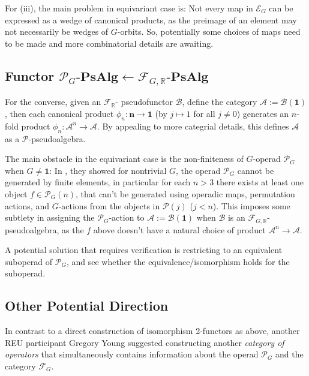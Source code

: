 \documentclass[openany, amssymb, psamsfonts]{amsart}
\theoremstyle{definition}
\numberwithin{equation}{section}
\newcommand{\PsAlg}{\mathbf{PsAlg}} %
\newcommand{\F}{\mathscr{F}} %
\newcommand{\cP}{\mathscr{P}} %
\newcommand{\A}{\mathscr{A}}
\newcommand{\B}{\mathscr{B}}
\newcommand{\RR}{\mathbb{R}} %
\begin{document}
For (iii), the main problem in equivariant case is: Not every map in $\mathscr{E}_G$ can be expressed as a wedge of canonical products, as the preimage of an element may not necessarily be wedges of $G$-orbits. So, potentially some choices of maps need to be made and more combinatorial details are awaiting.

\vspace{1pt}

\subsection{Functor $\cP_G\text{-}\PsAlg\leftarrow\F_{G,\RR}\text{-}\PsAlg$}

For the converse, given an $\F_{\RR}$- pseudofunctor $\B$, define the category $\A:=\B(\mathbf{1})$, then each canonical product $\phi_n:\mathbf{n}\rightarrow\mathbf{1}$ (by $j\mapsto 1$ for all $j\neq 0$) generates an $n$-fold product $\phi_n:\A^n\rightarrow\A$. By appealing to more categrial details, this defines $\A$ as a $\cP$-pseudoalgebra.

The main obstacle in the equivariant case is the non-finiteness of $G$-operad $\cP_G$ when $G\neq \mathbf{1}$: In \cite{BBKO21}, they showed for nontrivial $G$, the operad $\cP_G$ cannot be generated by finite elements, in particular for each $n>3$ there exists at least one object $f\in \cP_G(n)$, that can't be generated using operadic maps, permutation actions, and $G$-actions from the objects in $\cP(j)$ ($j<n$). This imposes some subtlety in assigning the $\cP_G$-action to $\A:= \B(\mathbf{1})$ when $\B$ is an $\F_{G,\RR}$-pseudoalgebra, as the $f$ above doesn't have a natural choice of product $\A^n\rightarrow\A$.

A potential solution that requires verification is restricting to an equivalent suboperad of $\cP_G$, and see whether the equivalence/isomorphism holds for the suboperad.

\vspace{1pt}

\subsection{Other Potential Direction}
In contrast to a direct construction of isomorphism 2-functors as above, another REU participant Gregory Young suggested constructing another \emph{category of operators} that simultaneously contains information about the operad $\cP_G$ and the category $\F_G$.

\vspace{1pt}
\end{document}
